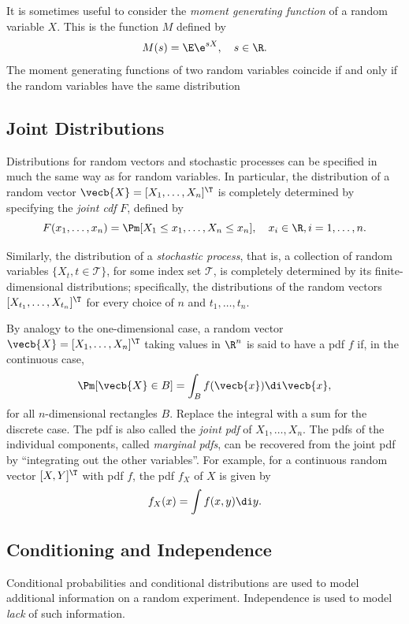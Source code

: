 It is sometimes useful to consider the \textit{moment generating function} of a random variable $X$. This is the function $M$ defined by
\begin{equation}M(s) = \E\e^{sX}, \quad s \in \R. \label{eq:MomentGeneratingFunction}
\end{equation}
The moment generating functions of two random variables coincide if and only if the random variables have the same distribution

\subsection{Joint Distributions}
Distributions for random vectors and stochastic processes can be specified in much the same way as for random variables. In particular, the distribution of a random vector $\vecb{X} = [X_1, \dots, X_n]^\T$ is completely determined by specifying the \textit{joint cdf} $F$, defined by
\begin{equation*}
	F(x_1, \dots, x_n) = \Pm[X_1 \le x_1, \dots, X_n \le x_n], \quad x_i \in \R, i = 1, \dots, n.
\end{equation*}

Similarly, the distribution of a \textit{stochastic process}, that is, a collection of random variables $\{X_t, t \in \mathcal{T}\}$, for some index set $\mathcal{T}$, is completely determined by its finite-dimensional distributions; specifically, the distributions of the random vectors $[X_{t_1}, \dots, X_{t_n}]^\T$ for every choice of $n$ and $t_1, \dots, t_n$.

By analogy to the one-dimensional case, a random vector $\vecb{X} = [X_1, \dots, X_n]^\T$ taking values in $\R^n$ is said to have a pdf $f$ if, in the continuous case,
\begin{equation}
	\Pm[\vecb{X} \in B] = \int_B f(\vecb{x}) \di \vecb{x}, \label{eq:JointProbContinuous}
\end{equation}
for all $n$-dimensional rectangles $B$. Replace the integral with a sum for the discrete case. The pdf is also called the \textit{joint pdf} of $X_1, \dots, X_n$. The pdfs of the individual components, called \textit{marginal pdfs}, can be recovered from the joint pdf by ``integrating out the other variables''. For example, for a continuous random vector $[X, Y]^\T$ with pdf $f$, the pdf $f_X$ of $X$ is given by
\begin{equation*}
	f_X(x) = \int f(x, y) \di y.
\end{equation*}

\subsection{Conditioning and Independence}
Conditional probabilities and conditional distributions are used to model additional information on a random experiment. Independence is used to model \textit{lack} of such information.

